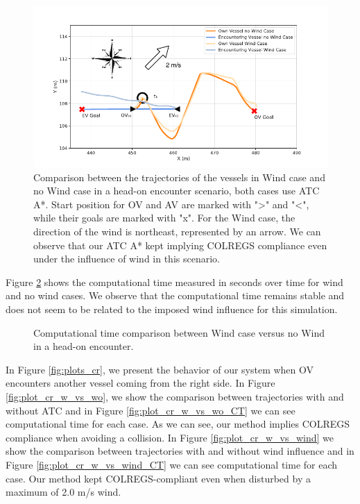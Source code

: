         
        \begin{figure}[H]
            \centering
            \includegraphics[width=\textwidth]{figs/Chap5/plot_ho_w_vs_wind.pdf}
            \caption{Comparison between the trajectories of the vessels in Wind case and no Wind case in a head-on encounter scenario, both cases use \ac{ATC} A*. Start position for \ac{OV} and \ac{AV} are marked with ">" and "<", while their goals are marked with "x". For the Wind case, the direction of the wind is northeast, represented by an arrow. We can observe that our \ac{ATC} A* kept implying COLREGS compliance even under the influence of wind in this scenario.}
            \label{fig:plot_ho_w_vs_wind}
        \end{figure}
        
        Figure \ref{fig:plot_ho_w_vs_wind_CT} shows the computational time measured in seconds over time for wind and no wind cases. We observe that the computational time remains stable and does not seem to be related to the imposed wind influence for this simulation.
        \begin{figure}[H]
            \centering
            
            \caption{Computational time comparison between Wind case versus no Wind in a head-on encounter.}
            \label{fig:plot_ho_w_vs_wind_CT}
        \end{figure}
        
        In Figure \ref{fig:plots_cr}, we present the behavior of our system when \ac{OV} encounters another vessel coming from the right side. In Figure \ref{fig:plot_cr_w_vs_wo}, we show the comparison between trajectories with and without ATC and in Figure \ref{fig:plot_cr_w_vs_wo_CT} we can see computational time for each case. As we can see, our method implies COLREGS compliance when avoiding a collision. In Figure \ref{fig:plot_cr_w_vs_wind} we show the comparison between trajectories with and without wind influence and in Figure \ref{fig:plot_cr_w_vs_wind_CT} we can see computational time for each case. Our method kept COLREGS-compliant even when disturbed by a maximum of 2.0 m/s wind.
        
